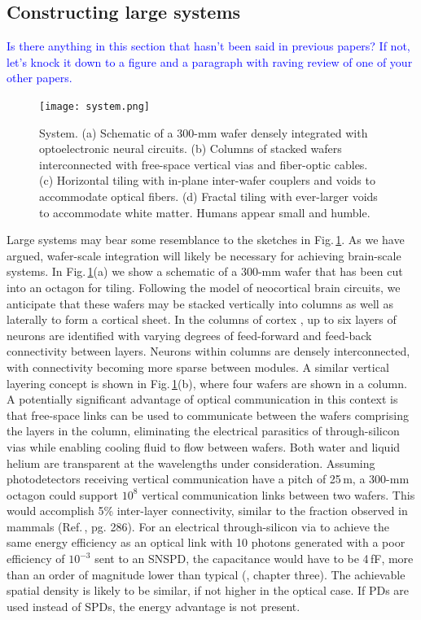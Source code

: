 \documentclass[twocolumn]{article}
\begin{document}
\subsection{Constructing large systems}
\label{sec:constructing_large_systems}
\textcolor{blue}{Is there anything in this section that hasn't been said in previous papers? If not, let's knock it down to a figure and a paragraph with raving review of one of your other papers.}
\begin{figure}[t!]
    \centering
    \texttt{[image: system.png]}
    \caption{System. (a) Schematic of a 300-mm wafer densely integrated with optoelectronic neural circuits. (b) Columns of stacked wafers interconnected with free-space vertical vias and fiber-optic cables. (c) Horizontal tiling with in-plane inter-wafer couplers and voids to accommodate optical fibers. (d) Fractal tiling with ever-larger voids to accommodate white matter. Humans appear small and humble.}
    \label{fig:system}
\end{figure}
Large systems may bear some resemblance to the sketches in Fig.\,\ref{fig:system}. As we have argued, wafer-scale integration will likely be necessary for achieving brain-scale systems. In Fig.\,\ref{fig:system}(a) we show a schematic of a 300-mm wafer that has been cut into an octagon for tiling. Following the model of neocortical brain circuits, we anticipate that these wafers may be stacked vertically into columns as well as laterally to form a cortical sheet. In the columns of cortex \cite{mo1978,mo1997}, up to six layers of neurons are identified with varying degrees of feed-forward and feed-back connectivity between layers. Neurons within columns are densely interconnected, with connectivity becoming more sparse between modules. A similar vertical layering concept is shown in Fig.\,\ref{fig:system}(b), where four wafers are shown in a column. A potentially significant advantage of optical communication in this context is that free-space links can be used to communicate between the wafers comprising the layers in the column, eliminating the electrical parasitics of through-silicon vias while enabling cooling fluid to flow between wafers. Both water and liquid helium are transparent at the wavelengths under consideration. Assuming photodetectors receiving vertical communication have a pitch of 25\,\textmu m, a 300-mm octagon could support $10^8$ vertical communication links between two wafers. This would accomplish 5\% inter-layer connectivity, similar to the fraction observed in mammals (Ref.\,, pg. 286). For an electrical through-silicon via to achieve the same energy efficiency as an optical link with 10 photons generated with a poor efficiency of $10^{-3}$ sent to an SNSPD, the capacitance would have to be 4\,fF, more than an order of magnitude lower than typical (\cite{elfe2016}, chapter three). The achievable spatial density is likely to be similar, if not higher in the optical case. If PDs are used instead of SPDs, the energy advantage is not present.
\end{document}
